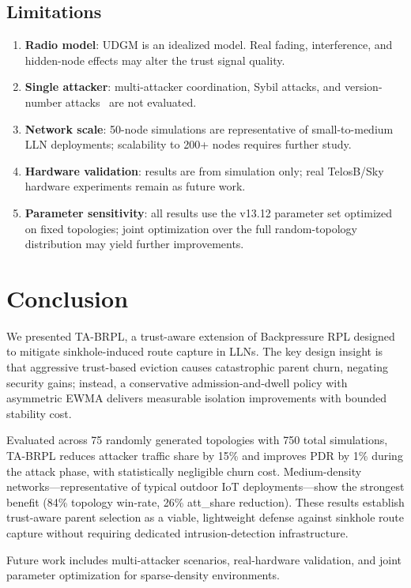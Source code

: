 \documentclass[conference]{IEEEtran}
\begin{document}
\subsection{Limitations}

\begin{enumerate}
\item \textbf{Radio model}: UDGM is an idealized model.
  Real fading, interference, and hidden-node effects may alter
  the trust signal quality.
\item \textbf{Single attacker}: multi-attacker coordination, Sybil attacks,
  and version-number attacks~\cite{dvir2011} are not evaluated.
\item \textbf{Network scale}: 50-node simulations are representative of
  small-to-medium LLN deployments;
  scalability to 200+ nodes requires further study.
\item \textbf{Hardware validation}: results are from simulation only;
  real TelosB/Sky hardware experiments remain as future work.
\item \textbf{Parameter sensitivity}: all results use the v13.12 parameter
  set optimized on fixed topologies;
  joint optimization over the full random-topology distribution
  may yield further improvements.
\end{enumerate}

\section{Conclusion}
\label{sec:conclusion}

We presented TA-BRPL, a trust-aware extension of Backpressure RPL
designed to mitigate sinkhole-induced route capture in LLNs.
The key design insight is that aggressive trust-based eviction
causes catastrophic parent churn, negating security gains;
instead, a conservative admission-and-dwell policy with asymmetric EWMA
delivers measurable isolation improvements with bounded stability cost.

Evaluated across 75 randomly generated topologies with 750 total simulations,
TA-BRPL reduces attacker traffic share by 15\% and improves PDR by 1\%
during the attack phase, with statistically negligible churn cost.
Medium-density networks---representative of typical outdoor IoT deployments---show
the strongest benefit (84\% topology win-rate, 26\% att\_share reduction).
These results establish trust-aware parent selection as a viable,
lightweight defense against sinkhole route capture without requiring
dedicated intrusion-detection infrastructure.

Future work includes multi-attacker scenarios, real-hardware validation,
and joint parameter optimization for sparse-density environments.



\end{document}
